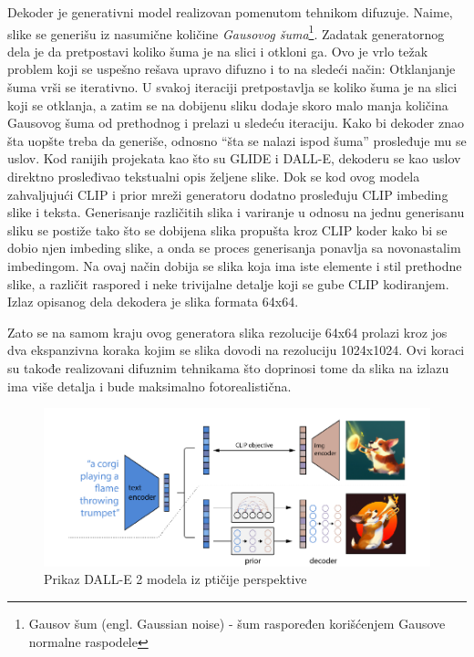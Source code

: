 \documentclass[12pt, letterpaper]{article}
\begin{document}
Dekoder je generativni model realizovan pomenutom tehnikom difuzuje. Naime, slike se generišu iz nasumične količine \textit{Gausovog šuma}\footnote{Gausov šum (engl. Gaussian noise) - šum raspoređen korišćenjem Gausove normalne raspodele}. Zadatak generatornog dela je da pretpostavi koliko šuma je na slici i otkloni ga. Ovo je vrlo težak problem koji se uspešno rešava upravo difuzno i to na sledeći način: Otklanjanje šuma vrši se iterativno\cite{gen1}. U svakoj iteraciji pretpostavlja se koliko šuma je na slici koji se otklanja, a zatim se na dobijenu sliku dodaje skoro malo manja količina Gausovog šuma od prethodnog i prelazi u sledeću iteraciju. Kako bi dekoder znao šta uopšte treba da generiše, odnosno “šta se nalazi ispod šuma” prosleđuje mu se uslov. Kod ranijih projekata kao što su GLIDE i DALL-E\cite{openai_glide, openai_dali}, dekoderu se kao uslov direktno prosleđivao tekstualni opis željene slike. Dok se kod ovog modela zahvaljujući CLIP i prior mreži generatoru dodatno prosleđuju CLIP imbeding slike i teksta. Generisanje različitih slika i variranje u odnosu na jednu generisanu sliku se postiže tako što se dobijena slika propušta kroz CLIP koder kako bi se dobio njen imbeding slike, a onda se proces generisanja ponavlja sa novonastalim imbedingom. Na ovaj način dobija se slika koja ima iste elemente i stil prethodne slike, a različit raspored i neke trivijalne detalje koji se gube CLIP kodiranjem. Izlaz opisanog dela dekodera je slika formata 64x64.

Zato se na samom kraju ovog generatora slika rezolucije 64x64 prolazi kroz jos dva ekspanzivna koraka kojim se slika dovodi na rezoluciju 1024x1024. Ovi koraci su takođe realizovani difuznim tehnikama što doprinosi tome da slika na izlazu ima više detalja i bude maksimalno fotorealistična.\cite{openai_dali}

\begin{figure}[htp]
\centering
\includegraphics[width=1\textwidth]{dalle2.png}
\caption{Prikaz DALL-E 2 modela iz ptičije perspektive}
\label{fig: dalle2slika}
\end{figure}
\end{document}
